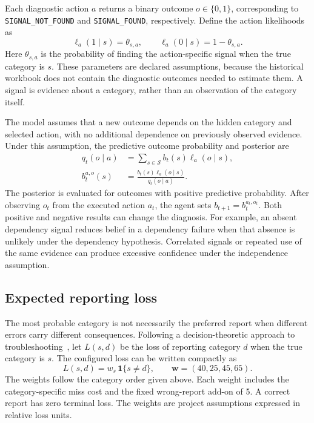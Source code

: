 \documentclass{article}
\begin{document}
Each diagnostic action $a$ returns a binary outcome $o\in\{0,1\}$,
corresponding to \texttt{SIGNAL\_NOT\_FOUND} and \texttt{SIGNAL\_FOUND},
respectively. Define the action likelihoods as
\begin{equation}
\ell_a(1\mid s)=\theta_{s,a},
\qquad
\ell_a(0\mid s)=1-\theta_{s,a}.
\label{eq:prob_binary_likelihood}
\end{equation}
Here $\theta_{s,a}$ is the probability of finding the action-specific signal
when the true category is $s$. These parameters are declared assumptions,
because the historical workbook does not contain the diagnostic outcomes
needed to estimate them. A signal is evidence about a category, rather than
an observation of the category itself.

The model assumes that a new outcome depends on the hidden category and
selected action, with no additional dependence on previously observed
evidence. Under this assumption, the predictive outcome probability and
posterior are
\begin{align}
q_t(o\mid a)
&=\sum_{s\in\mathcal{S}}b_t(s)\ell_a(o\mid s),
\label{eq:prob_predictive}\\
b_t^{a,o}(s)
&=\frac{b_t(s)\ell_a(o\mid s)}{q_t(o\mid a)}.
\label{eq:prob_update}
\end{align}
The posterior is evaluated for outcomes with positive predictive
probability. After observing $o_t$ from the executed action $a_t$, the agent
sets $b_{t+1}=b_t^{a_t,o_t}$. Both positive and negative results can change
the diagnosis. For example, an absent dependency signal reduces belief in
a dependency failure when that absence is unlikely under the dependency
hypothesis. Correlated signals or repeated use of the same evidence can
produce excessive confidence under the independence assumption.

\subsection{Expected reporting loss}

The most probable category is not necessarily the preferred report when
different errors carry different consequences. Following a decision-theoretic
approach to troubleshooting~\cite{Heckerman1995Troubleshooting}, let $L(s,d)$
be the loss of reporting category $d$ when the true category is $s$. The
configured loss can be written compactly as
\begin{equation}
L(s,d)=w_s\,\mathbf{1}\{s\neq d\},
\qquad \boldsymbol{w}=(40,25,45,65).
\label{eq:prob_loss}
\end{equation}
The weights follow the category order given above. Each weight includes
the category-specific miss cost and the fixed
wrong-report add-on of 5. A correct report has zero terminal loss. The
weights are project assumptions expressed in relative loss units.
\end{document}
